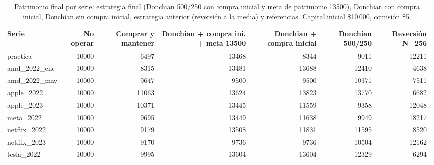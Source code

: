 \begin{table}[htbp]
\centering
\small
\begin{adjustbox}{max width=\linewidth}
\begin{tabular}{lrrrrrr}
\toprule
Serie & No operar & Comprar y mantener & Donchian + compra ini. + meta 13500 & Donchian + compra inicial & Donchian 500/250 & Reversión N=256 \\
\midrule
practica & 10000 & 6497 & 13468 & 8344 & 9011 & 12211 \\
amd\_2022\_ene & 10000 & 8315 & 13481 & 13688 & 12410 & 4638 \\
amd\_2022\_may & 10000 & 9647 & 9500 & 9500 & 10371 & 7511 \\
apple\_2022 & 10000 & 11063 & 13624 & 13823 & 13770 & 6682 \\
apple\_2023 & 10000 & 10371 & 13445 & 11559 & 9358 & 12048 \\
meta\_2022 & 10000 & 9695 & 13449 & 11638 & 9949 & 18217 \\
netflix\_2022 & 10000 & 9179 & 13508 & 11831 & 11595 & 8520 \\
netflix\_2023 & 10000 & 9170 & 9736 & 9736 & 10504 & 12162 \\
tesla\_2022 & 10000 & 9995 & 13604 & 13604 & 12329 & 6294 \\
\bottomrule
\end{tabular}
\end{adjustbox}
\caption{Patrimonio final por serie: estrategia final (Donchian 500/250 con compra inicial y meta de patrimonio 13500), Donchian con compra inicial, Donchian sin compra inicial, estrategia anterior (reversión a la media) y referencias. Capital inicial \$10\,000, comisión \$5.}
\end{table}
